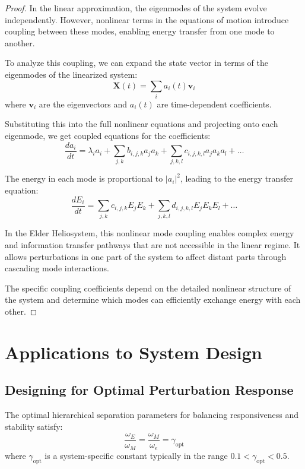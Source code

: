 \begin{proof}
In the linear approximation, the eigenmodes of the system evolve independently. However, nonlinear terms in the equations of motion introduce coupling between these modes, enabling energy transfer from one mode to another.

To analyze this coupling, we can expand the state vector in terms of the eigenmodes of the linearized system:
\begin{equation}
\mathbf{X}(t) = \sum_i a_i(t) \mathbf{v}_i
\end{equation}
where $\mathbf{v}_i$ are the eigenvectors and $a_i(t)$ are time-dependent coefficients.

Substituting this into the full nonlinear equations and projecting onto each eigenmode, we get coupled equations for the coefficients:
\begin{equation}
\frac{da_i}{dt} = \lambda_i a_i + \sum_{j,k} b_{i,j,k} a_j a_k + \sum_{j,k,l} c_{i,j,k,l} a_j a_k a_l + \ldots
\end{equation}

The energy in each mode is proportional to $|a_i|^2$, leading to the energy transfer equation:
\begin{equation}
\frac{dE_i}{dt} = \sum_{j,k} c_{i,j,k} E_j E_k + \sum_{j,k,l} d_{i,j,k,l} E_j E_k E_l + \ldots
\end{equation}

In the Elder Heliosystem, this nonlinear mode coupling enables complex energy and information transfer pathways that are not accessible in the linear regime. It allows perturbations in one part of the system to affect distant parts through cascading mode interactions.

The specific coupling coefficients depend on the detailed nonlinear structure of the system and determine which modes can efficiently exchange energy with each other.
\end{proof}

\section{Applications to System Design}

\subsection{Designing for Optimal Perturbation Response}

\begin{theorem}
The optimal hierarchical separation parameters for balancing responsiveness and stability satisfy:
\begin{equation}
\frac{\omega_E}{\omega_M} = \frac{\omega_M}{\omega_e} = \gamma_{\text{opt}}
\end{equation}
where $\gamma_{\text{opt}}$ is a system-specific constant typically in the range $0.1 < \gamma_{\text{opt}} < 0.5$.
\end{theorem}

